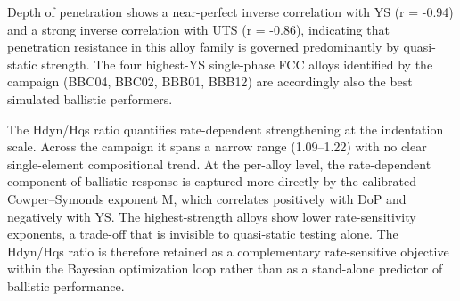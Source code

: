 \documentclass[final,5p,times,twocolumn]{elsarticle}
\begin{document}
Depth of penetration shows a near-perfect inverse correlation with YS (r = -0.94) and a strong inverse correlation with UTS (r = -0.86), indicating that penetration resistance in this alloy family is governed predominantly by quasi-static strength. The four highest-YS single-phase FCC alloys identified by the campaign (BBC04, BBC02, BBB01, BBB12) are accordingly also the best simulated ballistic performers.

The Hdyn/Hqs ratio quantifies rate-dependent strengthening at the indentation scale. Across the campaign it spans a narrow range (1.09–1.22) with no clear single-element compositional trend. At the per-alloy level, the rate-dependent component of ballistic response is captured more directly by the calibrated Cowper–Symonds exponent M, which correlates positively with DoP and negatively with YS. The highest-strength alloys show lower rate-sensitivity exponents, a trade-off that is invisible to quasi-static testing alone. The Hdyn/Hqs ratio is therefore retained as a complementary rate-sensitive objective within the Bayesian optimization loop rather than as a stand-alone predictor of ballistic performance.






\clearpage
{}

\end{document}
